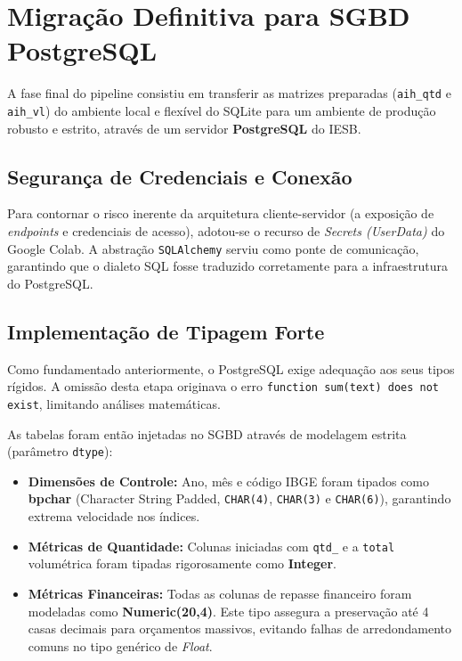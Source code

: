 \documentclass[12pt,a4paper]{report}
\begin{document}
\chapter{Migração Definitiva para SGBD PostgreSQL}

A fase final do pipeline consistiu em transferir as matrizes preparadas (\texttt{aih\_qtd} e \texttt{aih\_vl}) do ambiente local e flexível do SQLite para um ambiente de produção robusto e estrito, através de um servidor \textbf{PostgreSQL} do IESB.

\section{Segurança de Credenciais e Conexão}
Para contornar o risco inerente da arquitetura cliente-servidor (a exposição de \textit{endpoints} e credenciais de acesso), adotou-se o recurso de \textit{Secrets (UserData)} do Google Colab. A abstração \texttt{SQLAlchemy} serviu como ponte de comunicação, garantindo que o dialeto SQL fosse traduzido corretamente para a infraestrutura do PostgreSQL.

\section{Implementação de Tipagem Forte}
Como fundamentado anteriormente, o PostgreSQL exige adequação aos seus tipos rígidos. A omissão desta etapa originava o erro \texttt{function sum(text) does not exist}, limitando análises matemáticas.

As tabelas foram então injetadas no SGBD através de modelagem estrita (parâmetro \texttt{dtype}):
\begin{itemize}
\item \textbf{Dimensões de Controle:} Ano, mês e código IBGE foram tipados como \textbf{bpchar} (Character String Padded, \texttt{CHAR(4)}, \texttt{CHAR(3)} e \texttt{CHAR(6)}), garantindo extrema velocidade nos índices.
\item \textbf{Métricas de Quantidade:} Colunas iniciadas com \texttt{qtd\_} e a \texttt{total} volumétrica foram tipadas rigorosamente como \textbf{Integer}.
\item \textbf{Métricas Financeiras:} Todas as colunas de repasse financeiro foram modeladas como \textbf{Numeric(20,4)}. Este tipo assegura a preservação até 4 casas decimais para orçamentos massivos, evitando falhas de arredondamento comuns no tipo genérico de \textit{Float}.
\end{itemize}
\end{document}
